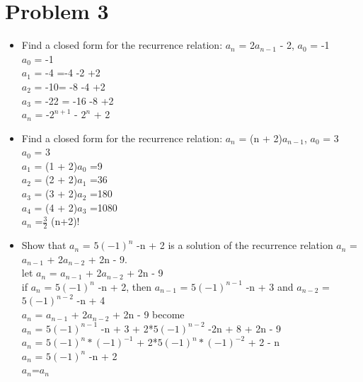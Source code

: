 \documentclass[12pt,letterpaper]{article}
\begin{document}
\section*{Problem 3}
\begin{itemize}
  \item Find a closed form for the recurrence relation: \(a_n\) = 2\(a_{n-1}\) - 2, \(a_0\) = -1\\
        \(a_0\) = -1\\
        \(a_1\) = -4 =-4 -2 +2 \\
        \(a_2\) = -10= -8 -4 +2\\
        \(a_3\) = -22 = -16 -8 +2\\
        \(a_n\) = -\(2^{n+1}\) - \(2^n\) + 2
  \item Find a closed form for the recurrence relation: \(a_n\) = (n + 2)\(a_{n-1}\), \(a_0\) = 3\\
        \(a_0\) = 3\\
        \(a_1\) = (1 + 2)\(a_{0}\) =9\\
        \(a_2\) = (2 + 2)\(a_{1}\) =36\\
        \(a_3\) = (3 + 2)\(a_{2}\) =180\\
        \(a_4\) = (4 + 2)\(a_{3}\) =1080\\
        \(a_n\) =\(\frac{3}{2}\) (n+2)!
  \item  Show that \(a_{n}\) = \(5(-1)^n\) -n + 2 is a solution of the recurrence relation \(a_n\) = \(a_{n-1}\) + 2\(a_{n-2}\) + 2n - 9.\\
        let \(a_n\) = \(a_{n-1}\) + 2\(a_{n-2}\) + 2n - 9\\
        if \(a_{n}\) = \(5(-1)^n\) -n + 2, then \(a_{n-1}\) = \(5(-1)^{n-1}\) -n + 3 and \(a_{n-2}\) = \(5(-1)^{n-2}\) -n + 4\\
        \(a_n\) = \(a_{n-1}\) + 2\(a_{n-2}\) + 2n - 9 become\\
        \(a_n\) = \(5(-1)^{n-1}\) -n + 3 + 2*\(5(-1)^{n-2}\) -2n + 8 + 2n - 9\\
        \(a_n\) = \(5(-1)^{n}*(-1)^{-1}\) + 2*\(5(-1)^{n}*(-1)^{-2}\) + 2 - n\\
        \(a_{n}\) = \(5(-1)^n\) -n + 2\\
        \(a_{n}\)=\(a_{n}\)
\end{itemize}
\end{document}
